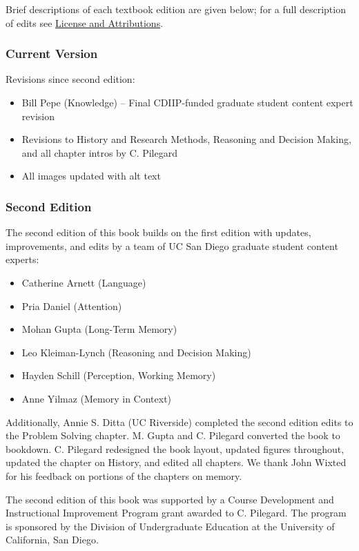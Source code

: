 \documentclass[
]{krantz}
\providecommand{\tightlist}{%
  \setlength{\itemsep}{0pt}\setlength{\parskip}{0pt}}
\begin{document}
Brief descriptions of each textbook edition are given below; for a full description of edits see \hyperref[license-and-attributions]{License and Attributions}.

\subsubsection*{Current Version}\label{current-version}


Revisions since second edition:

\begin{itemize}
\tightlist
\item
  Bill Pepe (Knowledge) -- Final CDIIP-funded graduate student content expert revision
\item
  Revisions to History and Research Methods, Reasoning and Decision Making, and all chapter intros by C. Pilegard
\item
  All images updated with alt text
\end{itemize}

\subsubsection*{Second Edition}\label{second-edition}


The second edition of this book builds on the first edition with updates, improvements, and edits by a team of UC San Diego graduate student content experts:

\begin{itemize}
\tightlist
\item
  Catherine Arnett (Language)
\item
  Pria Daniel (Attention)
\item
  Mohan Gupta (Long-Term Memory)
\item
  Leo Kleiman-Lynch (Reasoning and Decision Making)
\item
  Hayden Schill (Perception, Working Memory)
\item
  Anne Yilmaz (Memory in Context)
\end{itemize}

Additionally, Annie S. Ditta (UC Riverside) completed the second edition edits to the Problem Solving chapter. M. Gupta and C. Pilegard converted the book to bookdown. C. Pilegard redesigned the book layout, updated figures throughout, updated the chapter on History, and edited all chapters. We thank John Wixted for his feedback on portions of the chapters on memory.

The second edition of this book was supported by a Course Development and Instructional Improvement Program grant awarded to C. Pilegard. The program is sponsored by the Division of Undergraduate Education at the University of California, San Diego.
\end{document}
